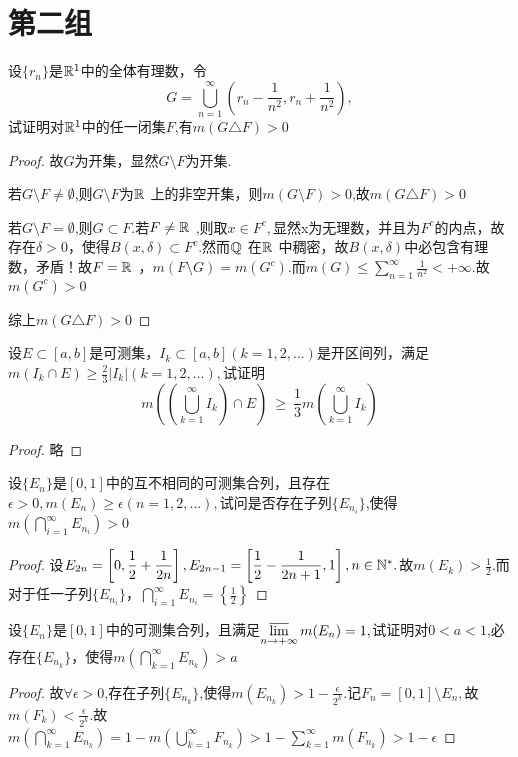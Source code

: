 \section{第二组}
设$\{r_n\}$是$\mathbb{R}^{1}$中的全体有理数，令$$G=\bigcup_{n=1}^{\infty}\left( r_n-\frac{1}{n^2},r_n+\frac{1}{n^2}\right), $$试证明对$\mathbb{R}^{1}$中的任一闭集$F$,有$m(G\triangle F)>0$
\begin{proof}
	故$G$为开集，显然$G\setminus F$为开集.\par 若$G\setminus F\neq\emptyset$,则$G\setminus F$为$\R{R}{\ }$上的非空开集，则$m(G\setminus F)>0$,故$m(G\triangle F)>0$\par 
	若$G\setminus F=\emptyset$,则$G\subset F$.若$F\neq \R{R}{\ }$,则取$x\in F^c,$显然x为无理数，并且为$F^c$的内点，故存在$\delta>0$，使得$B(x,\delta)\subset F^c.$然而$\mathbb{Q}^{\ }$在$\R{R}{\ }$中稠密，故$B(x,\delta)$中必包含有理数，矛盾！故$F=\R{R}{\ }$，$m(F\setminus G)=m(G^c)$.而$m(G)\leq \sum\limits_{n=1}^{\infty}\displaystyle{\frac{1}{n^2}}<+\infty$.故$m(G^c)>0$\par 综上$m(G\triangle F)>0$
\end{proof}


设$E\subset[a,b]$是可测集，$I_k\subset[a,b](k=1,2,...)$是开区间列，满足$m(I_k\cap E)\geq \displaystyle{\frac{2}{3}|I_k|}(k=1,2,...),$试证明$$m\left(\left(\bigcup_{k=1}^{\infty}I_k  \right)\cap E  \right)\ \geq \ \frac{1}{3}m\left(\bigcup_{k=1}^{\infty}I_k \right)  $$
\begin{proof}
	略
\end{proof}



设$\{E_n\}$是$[0,1]$中的互不相同的可测集合列，且存在$\epsilon>0,m(E_n)\geq \epsilon(n=1,2,...),$试问是否存在子列$\{E_{n_i}\}$,使得$m\left(\bigcap\limits_{i=1}^{\infty}E_{n_i} \right)>0 $
\begin{proof}
	设$E_{2n}=\left[ 0,\displaystyle{\frac{1}{2}+\frac{1}{2n}}\right],E_{2n-1}=\left[ \displaystyle{\frac{1}{2}-\frac{1}{2n+1}},1\right],n\in \mathbb{N}^{*} .$故$m(E_k)>\displaystyle{\frac{1}{2}}.$而对于任一子列$\{E_{n_i}\}$，$\bigcap\limits_{i=1}^{\infty}E_{n_i}=\left\lbrace \displaystyle{\frac{1}{2}}\right\rbrace $
\end{proof}


设$\{E_n\}$是$[0,1]$中的可测集合列，且满足$\varlimsup\limits_{n \to +\infty}m(E_n)=1,$试证明对$0<a<1$,必存在$\{E_{n_k}\}$，使得$m\left(\bigcap\limits_{k=1}^{\infty}E_{n_k} \right)>a $
\begin{proof}
	故$\forall \epsilon>0$,存在子列$\{E_{n_k}\}$,使得$m(E_{n_k})>\displaystyle{1-\frac{\epsilon}{2^k}}.$记$F_n=[0,1]\setminus E_n,$故$m(F_k)<\displaystyle{\frac{\epsilon}{2^k}}.$故$m\left(\bigcap\limits_{k=1}^{\infty}E_{n_k} \right)=1-m\left(\bigcup\limits_{k=1}^{\infty}F_{n_k} \right)>1-\sum\limits_{k=1}^{\infty}m(F_{n_k})>1-\epsilon $ 
\end{proof}

